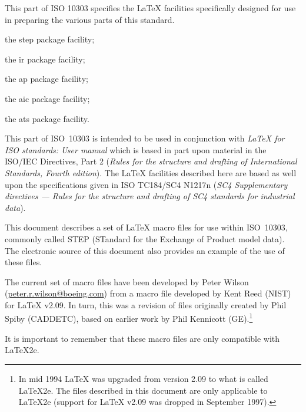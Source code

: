 \documentclass[wd,copyright,letterpaper]{isov2}
\newcommand{\file}[1]{\textsf{#1}}
\newcommand{\latex}{LaTeX}
\begin{document}
\begin{Introduction}%

    This part of ISO 10303 specifies the \latex{} facilities specifically 
designed for use in preparing the various parts of this standard.

\begin{majorsublist}
\item the \file{step} package facility;
\item the \file{ir} package facility;
\item the \file{ap} package facility;
\item the \file{aic} package facility;
\item the \file{ats} package facility.
\end{majorsublist}

    This part of ISO~10303 is intended to be used in conjunction with
\textit{\latex{} for ISO standards: User manual}
which is based in part upon material in the ISO/IEC Directives,
Part 2 (\textit{Rules for the structure and drafting of International 
Standards, Fourth edition}).
The \latex{} facilities described here are based as well
upon the specifications given in ISO TC184/SC4 N1217n 
(\textit{SC4 Supplementary directives --- Rules for the structure
and drafting of SC4 standards for industrial data}).




    This document describes a set of \latex{} macro files for use within
ISO~10303, commonly called STEP (STandard for the Exchange of Product
model data). The electronic source of this  document 
also provides an example of the use of these files.

    The current set of macro files have been developed by 
Peter Wilson (\url{peter.r.wilson@boeing.com}) from a macro file developed
by Kent Reed (NIST) for \latex{} v2.09. In turn, this was a revision of
files originally created by Phil Spiby (CADDETC), based on earlier work 
by Phil Kennicott (GE).\footnote{In mid 1994 \latex{} was upgraded 
from version 2.09 to what is called \latex 2e. The files described in 
this document are only applicable to \latex 2e (support for \latex{} v2.09
was dropped in September 1997).}


\begin{anote} 
It is important to remember that these macro files are only compatible with 
\latex 2e.
\end{anote} %


\end{Introduction}
\end{document}
